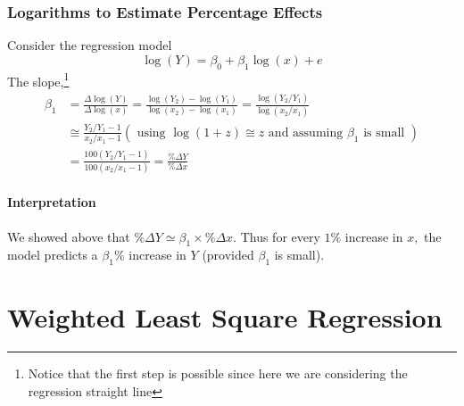 \documentclass[11pt]{article}
\begin{document}
\subsubsection{Logarithms to Estimate Percentage Effects}
Consider the regression model
\begin{equation*}
    \log (Y)=\beta_{0}+\beta_{1} \log (x)+e
\end{equation*}
The slope,\footnote{Notice that the first step is possible since here we are considering the regression straight line}
\begin{align*}
    \beta_{1} &=\frac{\Delta \log (Y)}{\Delta \log (x)} =\frac{\log \left(Y_{2}\right)-\log \left(Y_{1}\right)}{\log \left(x_{2}\right)-\log \left(x_{1}\right)}
    =\frac{\log \left(Y_{2} / Y_{1}\right)}{\log \left(x_{2} / x_{1}\right)} \\
    &\cong \frac{Y_{2} / Y_{1}-1}{x_{2} / x_{1}-1}\left(\text { using } \log (1+z) \cong z \text { and assuming } \beta_{1} \text { is small }\right) \\
    &=\frac{100\left(Y_{2} / Y_{1}-1\right)}{100\left(x_{2} / x_{1}-1\right)} =\frac{\% \Delta Y}{\% \Delta x}
\end{align*}

\paragraph{Interpretation} We showed above that $\% \Delta Y \simeq \beta_{1} \times \% \Delta x$. Thus for every \(1 \%\) increase in \(x,\) the model predicts a \(\beta_{1} \%\) increase in \(Y\) (provided
\(\beta_{1}\) is small).


\section{Weighted Least Square Regression}
\end{document}

